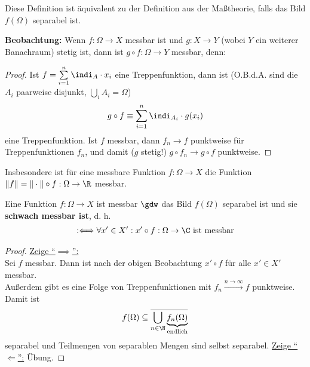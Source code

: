 \begin{bemerkung}
Diese Definition ist äquivalent zu der Definition aus der Maßtheorie, falls das Bild $f(\Omega)$ separabel ist.
\end{bemerkung}

\textbf{Beobachtung:} Wenn $f:\Omega\to X$ messbar ist und $g:X\to Y$ (wobei $Y$ ein weiterer Banachraum) stetig ist, dann ist $g\circ f:\Omega\to Y$ messbar, denn:

\begin{proof}
Ist $f=\sum\limits_{i=1}^n\indi_A\cdot x_i$ eine Treppenfunktion, dann ist (O.B.d.A. sind die $A_i$ paarweise disjunkt, $\bigcup\limits_i A_i=\Omega$)
\begin{align*}
g\circ f\equiv\sum\limits_{i=1}^n\indi_{A_i}\cdot g(x_i)
\end{align*}
eine Treppenfunktion. Ist $f$ messbar, dann $f_n\longrightarrow f$ punktweise für Treppenfunktionen $f_n$, und damit ($g$ stetig!) $g\circ f_n\to g\circ f$ punktweise.
\end{proof}

Insbesondere ist für eine messbare Funktion $f:\Omega\to X$ die Funktion\\ $\Vert f\Vert=\Vert\cdot\Vert\circ f:\Omega\to\R$ messbar.

\begin{theorem}[Pettis]\label{theoremPettis}\enter
Eine Funktion $f:\Omega\to X$ ist messbar $\gdw$ das Bild $f(\Omega)$ separabel ist und sie \textbf{schwach messbar ist}, d. h.
\begin{align*}
:\Longleftrightarrow\forall x'\in X':x'\circ f:\Omega\to\C\text{ ist messbar}
\end{align*}
\end{theorem}
\begin{proof}
\underline{Zeige ``$\implies$'':}\\
Sei $f$ messbar. Dann ist nach der obigen Beobachtung $x'\circ f$ für alle $x'\in X'$ messbar.\\
Außerdem gibt es eine Folge von Treppenfunktionen mit $f_n\stackrel{n\to\infty}{\longrightarrow} f$ punktweise. Damit ist
\begin{align*}
f(\Omega)\subseteq\overline{\bigcup\limits_{n\in\N}\underbrace{ f_n(\Omega)}_{\text{endlich}}}
\end{align*}
separabel und Teilmengen von separablen Mengen sind selbst separabel.\nl
\underline{Zeige ``$\Longleftarrow$'':} Übung.
\end{proof}

